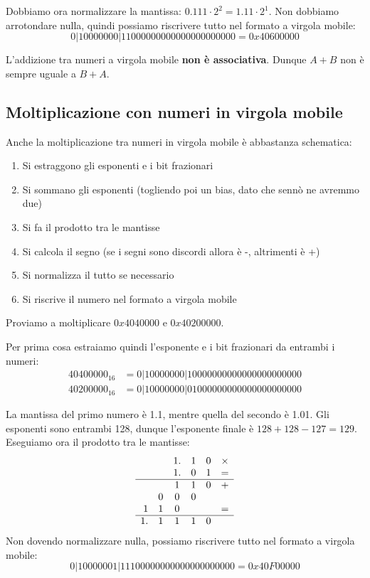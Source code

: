 \documentclass[11pt, a4paper, titlepage, oneside]{scrbook}
\begin{document}
Dobbiamo ora normalizzare la mantissa: $0.111 \cdot 2^2 = 1.11 \cdot 2^1$. Non dobbiamo arrotondare nulla, quindi possiamo riscrivere tutto nel formato a virgola mobile:
\[
0|10000000|11000000000000000000000 = 0x40600000
\]

\NB L'addizione tra numeri a virgola mobile \textbf{non è associativa}. Dunque $A + B$ non è sempre uguale a $B + A$.

\subsection{Moltiplicazione con numeri in virgola mobile}

Anche la moltiplicazione tra numeri in virgola mobile è abbastanza schematica:
\begin{enumerate}[label=\arabic*°]
    \item Si estraggono gli esponenti e i bit frazionari
    \item Si sommano gli esponenti (togliendo poi un bias, dato che sennò ne avremmo due)
    \item Si fa il prodotto tra le mantisse
    \item Si calcola il segno (se i segni sono discordi allora è -, altrimenti è +)
    \item Si normalizza il tutto se necessario
    \item Si riscrive il numero nel formato a virgola mobile
\end{enumerate}

Proviamo a moltiplicare $0x4040000$ e $0x40200000$.

Per prima cosa estraiamo quindi l'esponente e i bit frazionari da entrambi i numeri:
\begin{align*}
40400000_{16} &= 0|10000000|10000000000000000000000 \\
40200000_{16} &= 0|10000000|01000000000000000000000
\end{align*}

La mantissa del primo numero è 1.1, mentre quella del secondo è 1.01. Gli esponenti sono entrambi 128, dunque l'esponente finale è $128+128-127 = 129$. Eseguiamo ora il prodotto tra le mantisse:
\[
\begin{array}{rccccc}
& & 1. & 1 & 0 & \times \\
& & 1. & 0 & 1 & = \\
\hline
& & 1 & 1 & 0 & + \\
& 0 & 0 & 0 & & \\
1 & 1 & 0 & & & = \\
\hline
1. & 1 & 1 & 1 & 0
\end{array}
\]
Non dovendo normalizzare nulla, possiamo riscrivere tutto nel formato a virgola mobile:
\[
0|10000001|11100000000000000000000 = 0x40F00000
\]
\end{document}
